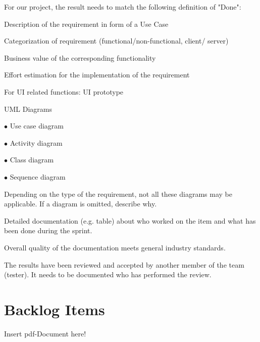 \documentclass[a4paper, 12pt]{article}
\begin{document}
For our project, the result needs to match the following definition of "Done":
\begin{todolist}

\item Description of the requirement in form of a Use Case
\item Categorization of requirement (functional/non-functional, client/ server)
\item Business value of the corresponding functionality
\item Effort estimation for the implementation of the requirement
\item For UI related functions: UI prototype
\item UML Diagrams 

    $\bullet$ Use case diagram
    
    $\bullet$ Activity diagram
    
    $\bullet$ Class diagram
    
    $\bullet$ Sequence diagram
    
    Depending on the type of the requirement, not all these diagrams may be applicable. If a diagram is omitted, describe why.
\item Detailed documentation (e.g. table) about who worked on the item and what has been done during the sprint.
\item Overall quality of the documentation meets general industry standards.
\item The results have been reviewed and accepted by another member of the team (tester). It needs to be documented who has performed the review.

\end{todolist}


\section{Backlog Items}

Insert pdf-Document here!

\end{document}
